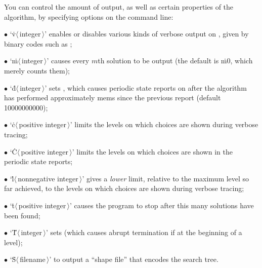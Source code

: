 You can control the amount of output, as well as certain properties
of the algorithm, by specifying options on the command line:
\smallskip\item{$\bullet$}
`\.v$\langle\,$integer$\,\rangle$' enables or disables various kinds of verbose
output on , given by binary codes such as ;
\item{$\bullet$}
`\.m$\langle\,$integer$\,\rangle$' causes every $m$th solution
to be output (the default is \.{m0}, which merely counts them);
\item{$\bullet$}
`\.d$\langle\,$integer$\,\rangle$' sets , which causes periodic
state reports on  after the algorithm has performed
approximately
 mems since the previous report (default 10000000000);
\item{$\bullet$}
`\.c$\langle\,$positive integer$\,\rangle$' limits the levels on which
choices are shown during verbose tracing;
\item{$\bullet$}
`\.C$\langle\,$positive integer$\,\rangle$' limits the levels on which
choices are shown in the periodic state reports;
\item{$\bullet$}
`\.l$\langle\,$nonnegative integer$\,\rangle$' gives a {\it lower\/} limit,
relative to the maximum level so far achieved, to the levels on which
choices are shown during verbose tracing;
\item{$\bullet$}
`\.t$\langle\,$positive integer$\,\rangle$' causes the program to
stop after this many solutions have been found;
\item{$\bullet$}
`\.T$\langle\,$integer$\,\rangle$' sets  (which causes abrupt
termination if  at the beginning of a level);
\item{$\bullet$}
`\.S$\langle\,$filename$\,\rangle$' to output a ``shape file'' that encodes
the search tree.


